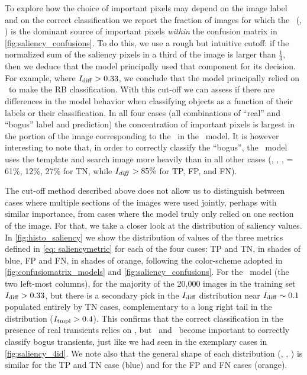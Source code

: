 To explore how the choice of important pixels may depend on the image label and on the correct classification we report  the fraction of images for which the \diff\ (\search, \temp) is the dominant source of important pixels {\it within} the confusion matrix in \autoref{fig:saliency_confusions}. To do this, we use a rough but intuitive cutoff: if the normalized sum of the saliency pixels in a third of the image is larger than $\frac{1}{3}$, then we deduce that the model principally used that component for its decision. For example, where $I_\mathrm{diff} > 0.33$, we conclude that the model principally relied on \diff\ to make the RB classification. With this cut-off we can assess if there are differences in the model behavior when classifying objects as a function of their labels or their classification.
In all four cases (all combinations of ``real'' and ``bogus'' label and prediction) the concentration of important pixels is largest in the portion of the image corresponding to the \diff\  in the \diabased\ model. It is however interesting to note that, in order to correctly classify the ``bogus'', the \diabased\ model uses the template and search image more heavily than in all other cases (\diff, \search, \temp,  = 61\%, 12\%, 27\% for TN, while $I_{\it diff}>85\%$ for TP, FP, and FN). 

The cut-off method described above does not allow us to distinguish between cases where multiple sections of the images were used jointly, perhaps with similar importance, from cases where the model truly only relied on one section of the image. For that, we take a closer look at the distribution of saliency values. 
In \autoref{fig:histo_saliency} we show the distribution of values of the three metrics defined in \autoref{eq: saliencymetric} for each of the four cases: TP and TN, in shades of blue, FP and FN, in shades of orange, following the color-scheme adopted in \autoref{fig:confusiomatrix_models} and \autoref{fig:saliency_confusions}. For the \diabased\ model (the two left-most columns), for the majority of the 20,000 images in the training set $I_\mathrm{diff} > 0.33$, but there is a secondary pick in the $I_\mathrm{diff}$ distribution near $I_\mathrm{diff} \sim0.1$ populated entirely by TN cases, complementary to a long right tail in the \itempl distribution ($I_\mathrm{tmpl} > 0.4$). This confirms that the correct classification in the presence of real transients relies on \diff, but \temp\ and \search\ become important to correctly classify bogus transients, just like we had seen in the exemplary cases in \autoref{fig:saliency_4id}. We note also that the general shape of each distribution (\idiff, \isearch, \itempl) is similar for the TP and TN case (blue) and for the FP and FN cases (orange). 
 
